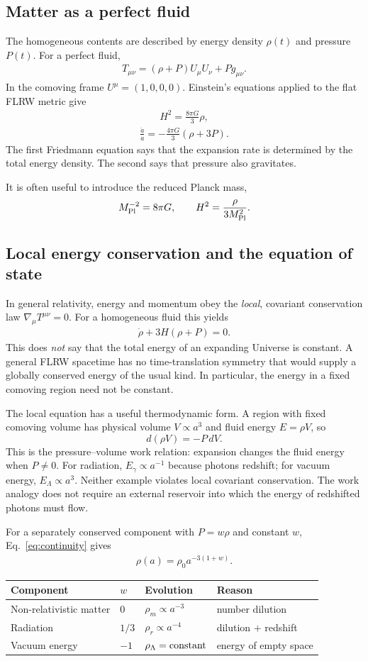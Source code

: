 \documentclass[12pt]{article}
\newcommand{\be}{\begin{eqnarray}}
\newcommand{\ee}{\end{eqnarray}}
\begin{document}
\subsection{Matter as a perfect fluid}
The homogeneous contents are described by energy density $\rho(t)$ and pressure
$P(t)$. For a perfect fluid,
\be
T_{\mu\nu}=(\rho+P)U_\mu U_\nu+Pg_{\mu\nu}.
\ee
In the comoving frame $U^\mu=(1,0,0,0)$. Einstein's equations applied to the flat
FLRW metric give
\be
\boxed{H^2=\frac{8\pi G}{3}\rho,}
\label{eq:Friedmann}
\ee
\be
\frac{\ddot a}{a}=-\frac{4\pi G}{3}(\rho+3P).
\label{eq:acceleration}
\ee
The first Friedmann equation says that the expansion rate is determined by the total
energy density. The second says that pressure also gravitates.

It is often useful to introduce the reduced Planck mass,
\[
M_{\rm Pl}^{-2}=8\pi G,
\qquad H^2=\frac{\rho}{3M_{\rm Pl}^2}.
\]

\subsection{Local energy conservation and the equation of state}
In general relativity, energy and momentum obey the \emph{local}, covariant
conservation law $\nabla_\mu T^{\mu\nu}=0$. For a homogeneous fluid this yields
\be
\boxed{\dot\rho+3H(\rho+P)=0.}
\label{eq:continuity}
\ee
This does \emph{not} say that the total energy of an expanding Universe is constant.
A general FLRW spacetime has no time-translation symmetry that would supply a
globally conserved energy of the usual kind. In particular, the energy in a fixed
comoving region need not be constant.

The local equation has a useful thermodynamic form. A region with fixed comoving
volume has physical volume $V\propto a^3$ and fluid energy $E=\rho V$, so
\[
d(\rho V)=-P\,dV.
\]
This is the pressure--volume work relation: expansion changes the fluid energy when
$P\ne0$. For radiation, $E_\gamma\propto a^{-1}$ because photons redshift; for vacuum
energy, $E_\Lambda\propto a^3$. Neither example violates local covariant conservation.
The work analogy does not require an external reservoir into which the energy of
redshifted photons must flow.

For a separately conserved component with $P=w\rho$ and constant $w$,
Eq.~\eqref{eq:continuity} gives
\be
\boxed{\rho(a)=\rho_0a^{-3(1+w)}.}
\ee

\begin{center}
\begin{tabular}{@{}llll@{}}\toprule
Component & $w$ & Evolution & Reason\\ \midrule
Non-relativistic matter & $0$ & $\rho_m\propto a^{-3}$ & number dilution\\
Radiation & $1/3$ & $\rho_r\propto a^{-4}$ & dilution $+$ redshift\\
Vacuum energy & $-1$ & $\rho_\Lambda={\rm constant}$ & energy of empty space\\ \bottomrule
\end{tabular}
\end{center}
\end{document}
